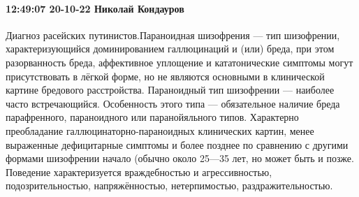  
 
 
 
 

\paragraph{12:49:07 20-10-22 Николай Кондауров}

Диагноз расейских путинистов.Парано‌идная шизофрени‌я — тип
шизофрении, характеризующийся доминированием галлюцинаций и (или) бреда, при
этом разорванность бреда, аффективное уплощение и кататонические симптомы могут
присутствовать в лёгкой форме, но не являются основными в клинической картине
бредового расстройства. Параноидный тип шизофрении — наиболее часто
встречающийся. Особенность этого типа — обязательное наличие бреда
парафренного, параноидного или паранойяльного типов. Характерно преобладание
галлюцинаторно-параноидных клинических картин, менее выраженные дефицитарные
симптомы и более позднее по сравнению с другими формами шизофрении начало
(обычно около 25—35 лет, но может быть и позже. Поведение характеризуется
враждебностью и агрессивностью, подозрительностью, напряжённостью,
нетерпимостью, раздражительностью.

